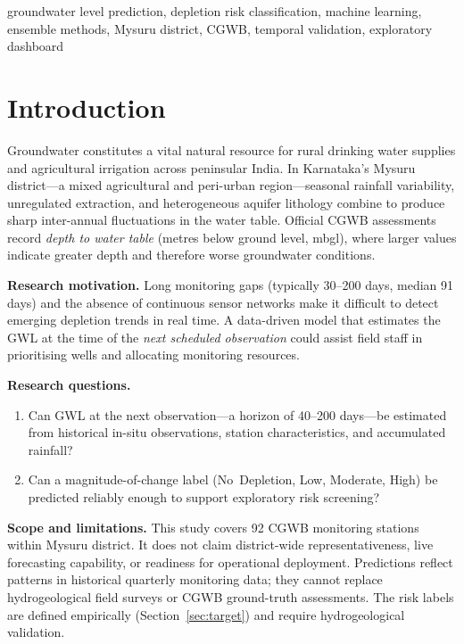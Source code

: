 \documentclass[conference]{IEEEtran}
\begin{document}
\begin{IEEEkeywords}
groundwater level prediction, depletion risk classification,
machine learning, ensemble methods, Mysuru district, CGWB,
temporal validation, exploratory dashboard
\end{IEEEkeywords}

\section{Introduction}
\label{sec:intro}

Groundwater constitutes a vital natural resource for rural drinking
water supplies and agricultural irrigation across peninsular India.
In Karnataka's Mysuru district---a mixed agricultural and
peri-urban region---seasonal rainfall variability, unregulated
extraction, and heterogeneous aquifer lithology combine to produce
sharp inter-annual fluctuations in the water table.
Official CGWB assessments record \emph{depth to water table}
(metres below ground level, mbgl), where larger values indicate
greater depth and therefore worse groundwater conditions.

\textbf{Research motivation.}
Long monitoring gaps (typically 30--200 days, median 91 days) and
the absence of continuous sensor networks make it difficult to
detect emerging depletion trends in real time.
A data-driven model that estimates the GWL at the time of the
\emph{next scheduled observation} could assist field staff in
prioritising wells and allocating monitoring resources.

\textbf{Research questions.}
\begin{enumerate}
  \item Can GWL at the next observation---a horizon of
        40--200 days---be estimated from historical in-situ
        observations, station characteristics, and
        accumulated rainfall?
  \item Can a magnitude-of-change label (No~Depletion, Low,
        Moderate, High) be predicted reliably enough to support
        exploratory risk screening?
\end{enumerate}

\textbf{Scope and limitations.}
This study covers 92 CGWB monitoring stations within Mysuru
district.
It does not claim district-wide representativeness, live
forecasting capability, or readiness for operational deployment.
Predictions reflect patterns in historical quarterly monitoring
data; they cannot replace hydrogeological field surveys or
CGWB ground-truth assessments.
The risk labels are defined empirically (Section~\ref{sec:target})
and require hydrogeological validation.
\end{document}
